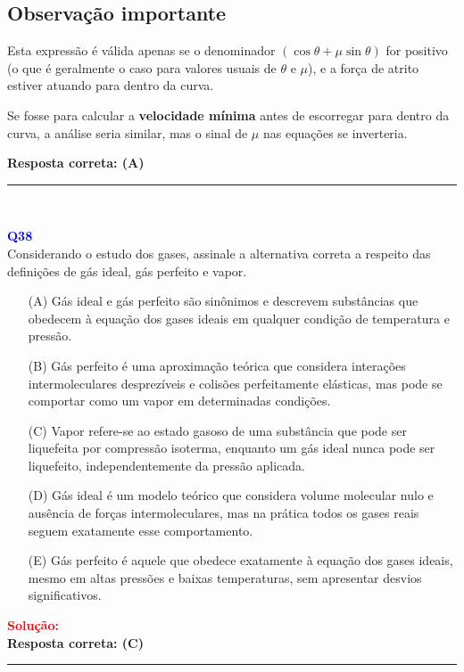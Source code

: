 \documentclass[a4paper,12pt]{article}
\begin{document}
\begin{flushleft}
\subsection*{Observação importante}

Esta expressão é válida apenas se o denominador \( \left( \cos\theta + \mu \sin\theta \right) \) for positivo (o que é geralmente 
o caso para valores usuais de \(\theta\) e \(\mu\)), e a força de atrito estiver atuando para dentro da curva.

Se fosse para calcular a \textbf{velocidade mínima} antes de escorregar para dentro da curva, a análise seria similar, 
mas o sinal de \(\mu\) nas equações se inverteria.

\textbf{Resposta correta: \colorbox{green!50}{(A)}}

\end{flushleft}
\noindent\rule{\linewidth}{0.6pt}\\

\begin{flushleft}
\textbf{\textcolor{blue}{\Large Q38}}\\

Considerando o estudo dos gases, assinale a
alternativa correta a respeito das definições de
gás ideal, gás perfeito e vapor.

\begin{itemize}
    \item[(A)] Gás ideal e gás perfeito são sinônimos e
    descrevem substâncias que obedecem à
    equação dos gases ideais em qualquer condição
    de temperatura e pressão.
    \item[(B)] Gás perfeito é uma aproximação teórica que
    considera
    interações
    intermoleculares
    desprezíveis e colisões perfeitamente elásticas,
    mas pode se comportar como um vapor em
    determinadas condições.
    \item[(\colorbox{green!50}{C})] Vapor refere-se ao estado gasoso de uma
    substância que pode ser liquefeita por
    compressão isoterma, enquanto um gás ideal
    nunca pode ser liquefeito, independentemente da
    pressão aplicada.
    \item[(D)] Gás ideal é um modelo teórico que considera
    volume molecular nulo e ausência de forças
    intermoleculares, mas na prática todos os gases
    reais seguem exatamente esse comportamento.
    \item[(E)] Gás perfeito é aquele que obedece exatamente à
    equação dos gases ideais, mesmo em altas
    pressões e baixas temperaturas, sem apresentar
    desvios significativos.
\end{itemize}

\vspace{0.5cm}

\textcolor{red}{\textbf{Solução:}}\\

\textbf{Resposta correta: \colorbox{green!50}{(C)}}

\end{flushleft}
\noindent\rule{\linewidth}{0.6pt}\\
\end{document}
